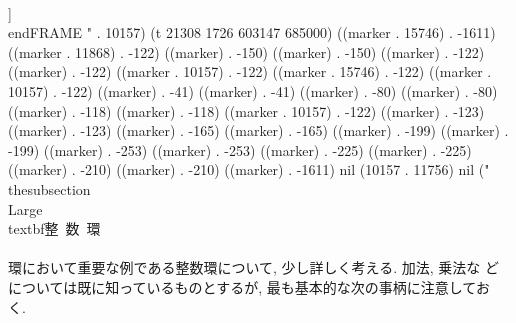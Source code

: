  \\]
\\end{FRAME}
" . 10157) (t 21308 1726 603147 685000) ((marker . 15746) . -1611) ((marker . 11868) . -122) ((marker) . -150) ((marker) . -150) ((marker) . -122) ((marker) . -122) ((marker . 10157) . -122) ((marker . 15746) . -122) ((marker . 10157) . -122) ((marker) . -41) ((marker) . -41) ((marker) . -80) ((marker) . -80) ((marker) . -118) ((marker) . -118) ((marker . 10157) . -122) ((marker) . -123) ((marker) . -123) ((marker) . -165) ((marker) . -165) ((marker) . -199) ((marker) . -199) ((marker) . -253) ((marker) . -253) ((marker) . -225) ((marker) . -225) ((marker) . -210) ((marker) . -210) ((marker) . -1611) nil (10157 . 11756) nil ("\\thesubsection{\\Large{\\textbf{整~数~環}}}\\\\
環において重要な例である整数環について, 少し詳しく考える. 加法, 乗法な
どについては既に知っているものとするが, 最も基本的な次の事柄に注意してお
く. 


